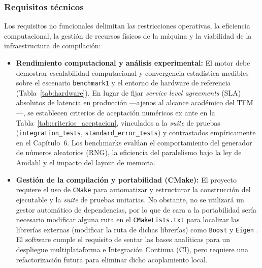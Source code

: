 \documentclass[11pt]{article}
\begin{document}
\subsubsection{Requisitos técnicos}

Los requisitos no funcionales delimitan las restricciones operativas, la eficiencia computacional, la gestión de recursos físicos de la máquina y la viabilidad de la infraestructura de compilación:

\begin{itemize}
    \item \textbf{Rendimiento computacional y análisis experimental:}
    El motor debe demostrar escalabilidad computacional y convergencia estadística medibles sobre el escenario \texttt{benchmark1} y el entorno de hardware de referencia (Tabla~\ref{tab:hardware}). En lugar de fijar \emph{service level agreements} (SLA) absolutos de latencia en producción ---ajenos al alcance académico del TFM---, se establecen criterios de aceptación numéricos ex ante en la Tabla~\ref{tab:criterios_aceptacion}, vinculados a la \textit{suite} de pruebas (\texttt{integration\_tests}, \texttt{standard\_error\_tests}) y contrastados empíricamente en el Capítulo~6. Los benchmarks evalúan el comportamiento del generador de números aleatorios (RNG), la eficiencia del paralelismo bajo la ley de Amdahl \cite{amdahl1967validity} y el impacto del layout de memoria.

    \item \textbf{Gestión de la compilación y portabilidad (CMake):}
    El proyecto requiere el uso de \texttt{CMake} \cite{cmake_software} para automatizar y estructurar la construcción del ejecutable y la \textit{suite} de pruebas unitarias. No obstante, no se utilizará un gestor automático de dependencias, por lo que de cara a la portabilidad sería necesario modificar alguna ruta en el \texttt{CMakeLists.txt} para localizar las librerías externas (modificar la ruta de dichas librerías) como \texttt{Boost} \cite{boost_libraries} y \texttt{Eigen} \cite{eigenweb}. El software cumple el requisito de sentar las bases analíticas para un despliegue multiplataforma e Integración Continua (CI), pero requiere una refactorización futura para eliminar dicho acoplamiento local.


\end{itemize}
\end{document}
